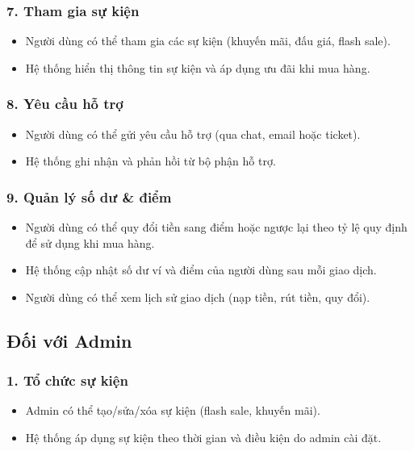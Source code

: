 \documentclass{article}
\begin{document}
\subsubsection*{7. Tham gia sự kiện}
\begin{itemize}
    \item Người dùng có thể tham gia các sự kiện (khuyến mãi, đấu giá, flash sale).

    \item Hệ thống hiển thị thông tin sự kiện và áp dụng ưu đãi khi mua hàng.
\end{itemize}

\subsubsection*{8. Yêu cầu hỗ trợ}
\begin{itemize}
    \item Người dùng có thể gửi yêu cầu hỗ trợ (qua chat, email hoặc ticket).

    \item Hệ thống ghi nhận và phản hồi từ bộ phận hỗ trợ.
\end{itemize}

\subsubsection*{9. Quản lý số dư \& điểm }


\begin{itemize}

    \item Người dùng có thể quy đổi tiền sang điểm hoặc ngược lại theo tỷ lệ quy định để sử dụng khi mua hàng.
    \item Hệ thống cập nhật số dư ví và điểm của người dùng sau mỗi giao dịch.
    \item Người dùng có thể xem lịch sử giao dịch (nạp tiền, rút tiền, quy đổi).
\end{itemize}

\subsection*{Đối với Admin}

\subsubsection*{1. Tổ chức sự kiện}
\begin{itemize}
    \item Admin có thể tạo/sửa/xóa sự kiện (flash sale, khuyến mãi).
    \item Hệ thống áp dụng sự kiện theo thời gian và điều kiện do admin cài đặt.
\end{itemize}
\end{document}
